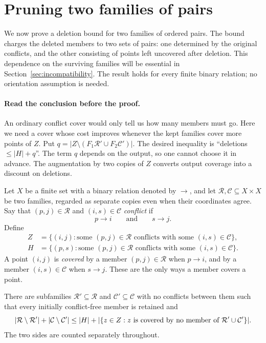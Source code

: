 \section{Pruning two families of pairs}\label{sec:pruning}

We now prove a deletion bound for two families of ordered pairs.  The bound
charges the deleted members to two sets of pairs: one determined by the
original conflicts, and the other consisting of points left uncovered after
deletion.  This dependence on the surviving families will be essential in
Section~\ref{sec:incompatibility}.  The result holds for every finite binary
relation; no orientation assumption is needed.


\paragraph{Read the conclusion before the proof.}
An ordinary conflict cover would only tell us how many members must go.
Here we need a cover whose cost improves whenever the kept families cover
more points of $Z$. Put $q=|Z\setminus(F_1\mathcal R'\cup F_2\mathcal C')|$.
The desired inequality is ``deletions $\le |H|+q$''. The term $q$ depends
on the output, so one cannot choose it in advance. The augmentation by two
copies of $Z$ converts output coverage into a discount on deletions.

\begin{lemma}[Pruning]\label{lem:pruning}
Let $X$ be a finite set with a binary relation denoted by $\to$, and let
$\mathcal R,\mathcal C\subseteq X\times X$ be two families, regarded as
separate copies even when their coordinates agree.  Say that
$(p,j)\in\mathcal R$ and $(i,s)\in\mathcal C$ \emph{conflict} if
\[
 p\to i\qquad\text{and}\qquad s\to j.
\]
Define
\begin{align*}
 Z&=\{(i,j):\text{some }(p,j)\in\mathcal R
       \text{ conflicts with some }(i,s)\in\mathcal C\},\\
 H&=\{(p,s):\text{some }(p,j)\in\mathcal R
       \text{ conflicts with some }(i,s)\in\mathcal C\}.
\end{align*}
A point $(i,j)$ is \emph{covered} by a member $(p,j)\in\mathcal R$ when
$p\to i$, and by a member $(i,s)\in\mathcal C$ when $s\to j$.
These are the only ways a member covers a point.

There are subfamilies $\mathcal R'\subseteq\mathcal R$ and
$\mathcal C'\subseteq\mathcal C$ with no conflicts between them such that
every initially conflict-free member is retained and
\begin{equation}\label{eq:pruning-bound}
 \lvert \mathcal R\setminus\mathcal R'\rvert+
 \lvert \mathcal C\setminus\mathcal C'\rvert
 \leq \lvert H\rvert+
 \lvert \{z\in Z:z\text{ is covered by no member of }
                    \mathcal R'\cup\mathcal C'\}\rvert.
\end{equation}
The two sides are counted separately throughout.
\end{lemma}

